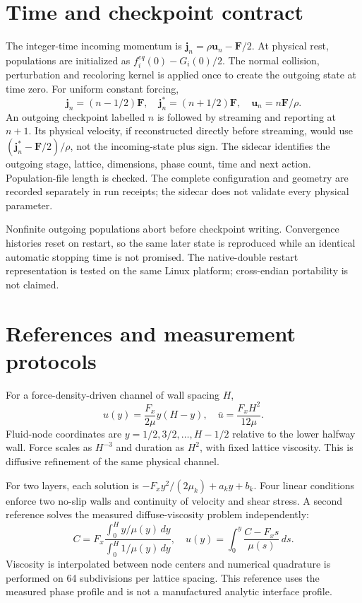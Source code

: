 \documentclass[11pt]{article}
\begin{document}
\section{Time and checkpoint contract}
The integer-time incoming momentum is $\bm j_n=\rho\bm u_n-\bm F/2$.
At physical rest, populations are initialized as
$f_i^{eq}(0)-G_i(0)/2$. The normal collision, perturbation and recoloring
kernel is applied once to create the outgoing state at time zero.
For uniform constant forcing,
\begin{equation}
 \bm j_n=(n-1/2)\bm F,\quad \bm j_n^*=(n+1/2)\bm F,\quad
 \bm u_n=n\bm F/\rho.
\end{equation}
An outgoing checkpoint labelled $n$ is followed by streaming and reporting
at $n+1$. Its physical velocity, if reconstructed directly before streaming,
would use $(\bm j_n^*-\bm F/2)/\rho$, not the incoming-state plus sign.
The sidecar identifies the outgoing stage, lattice, dimensions, phase count,
time and next action. Population-file length is checked. The complete
configuration and geometry are recorded separately in run receipts; the
sidecar does not validate every physical parameter.

Nonfinite outgoing populations abort before checkpoint writing.
Convergence histories reset on restart, so the same later state is
reproduced while an identical automatic stopping time is not promised.
The native-double restart representation is tested on the same Linux
platform; cross-endian portability is not claimed.

\section{References and measurement protocols}
For a force-density-driven channel of wall spacing $H$,
\begin{equation}
 u(y)=\frac{F_x}{2\mu}y(H-y),\quad \overline u=\frac{F_xH^2}{12\mu}.
\end{equation}
Fluid-node coordinates are $y=1/2,3/2,\ldots,H-1/2$ relative to the lower
halfway wall. Force scales as $H^{-3}$ and duration as $H^2$, with fixed
lattice viscosity. This is diffusive refinement of the same physical channel.

For two layers, each solution is $-F_xy^2/(2\mu_k)+a_ky+b_k$.
Four linear conditions enforce two no-slip walls and continuity of velocity
and shear stress. A second reference solves the measured diffuse-viscosity
problem independently:
\begin{equation}
 C=F_x\frac{\int_0^H y/\mu(y)\,dy}{\int_0^H 1/\mu(y)\,dy},\quad
 u(y)=\int_0^y\frac{C-F_xs}{\mu(s)}\,ds.
\end{equation}
Viscosity is interpolated between node centers and numerical quadrature is
performed on 64 subdivisions per lattice spacing. This reference uses the
measured phase profile and is not a manufactured analytic interface profile.
\end{document}
